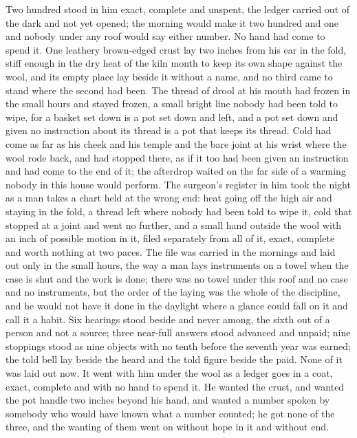 Two hundred stood in him exact, complete and unspent, the ledger carried out of the dark and not yet opened; the morning would make it two hundred and one and nobody under any roof would say either number. No hand had come to spend it. One leathery brown-edged crust lay two inches from his ear in the fold, stiff enough in the dry heat of the kiln month to keep its own shape against the wool, and its empty place lay beside it without a name, and no third came to stand where the second had been. The thread of drool at his mouth had frozen in the small hours and stayed frozen, a small bright line nobody had been told to wipe, for a basket set down is a pot set down and left, and a pot set down and given no instruction about its thread is a pot that keeps its thread. Cold had come as far as his cheek and his temple and the bare joint at his wrist where the wool rode back, and had stopped there, as if it too had been given an instruction and had come to the end of it; the afterdrop waited on the far side of a warming nobody in this house would perform. The surgeon's register in him took the night as a man takes a chart held at the wrong end: heat going off the high air and staying in the fold, a thread left where nobody had been told to wipe it, cold that stopped at a joint and went no further, and a small hand outside the wool with an inch of possible motion in it, filed separately from all of it, exact, complete and worth nothing at two paces. The file was carried in the mornings and laid out only in the small hours, the way a man lays instruments on a towel when the case is shut and the work is done; there was no towel under this roof and no case and no instruments, but the order of the laying was the whole of the discipline, and he would not have it done in the daylight where a glance could fall on it and call it a habit. Six hearings stood beside and never among, the sixth out of a person and not a source; three near-full answers stood advanced and unpaid; nine stoppings stood as nine objects with no tenth before the seventh year was earned; the told bell lay beside the heard and the told figure beside the paid. None of it was laid out now. It went with him under the wool as a ledger goes in a coat, exact, complete and with no hand to spend it. He wanted the crust, and wanted the pot handle two inches beyond his hand, and wanted a number spoken by somebody who would have known what a number counted; he got none of the three, and the wanting of them went on without hope in it and without end.

